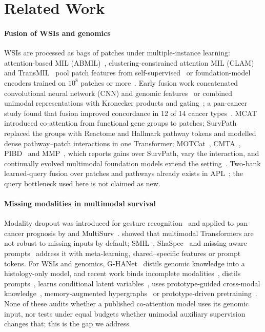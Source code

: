 \documentclass{article}
\begin{document}
\section{Related Work}
\label{sec:related}

\paragraph{Fusion of WSIs and genomics} WSIs are processed as bags of patches under multiple-instance learning: attention-based MIL (ABMIL)~\citep{ilse2018abmil}, clustering-constrained attention MIL (CLAM)~\citep{lu2021clam} and TransMIL~\citep{shao2021transmil} pool patch features from self-supervised~\citep{wang2022ctranspath} or foundation-model encoders trained on $10^8$ patches or more~\citep{chen2024uni,xu2024gigapath,vorontsov2024virchow}. Early fusion work concatenated convolutional neural network (CNN) and genomic features~\citep{mobadersany2018predicting} or combined unimodal representations with Kronecker products and gating~\citep{chen2022pathomic}; a pan-cancer study found that fusion improved concordance in 12 of 14 cancer types~\citep{chen2022pancancer}. MCAT~\citep{chen2021mcat} introduced co-attention from functional gene groups to patches; SurvPath~\citep{jaume2024survpath} replaced the groups with Reactome and Hallmark pathway tokens and modelled dense pathway--patch interactions in one Transformer; MOTCat~\citep{xu2023motcat}, CMTA~\citep{zhou2023cmta}, PIBD~\citep{zhang2024pibd} and MMP~\citep{song2024mmp}, which reports gains over SurvPath, vary the interaction, and continually evolved multimodal foundation models extend the setting~\citep{peng2025continual}. Two-bank learned-query fusion over patches and pathways already exists in APL~\citep{liu2025apl}; the query bottleneck used here is not claimed as new.

\paragraph{Missing modalities in multimodal survival} Modality dropout was introduced for gesture recognition~\citep{neverova2016moddrop} and applied to pan-cancer prognosis by \citet{cheerla2019deep} and MultiSurv~\citep{valesilva2021long}. \citet{ma2022robust} showed that multimodal Transformers are not robust to missing inputs by default; SMIL~\citep{ma2021smil}, ShaSpec~\citep{wang2023shaspec} and missing-aware prompts~\citep{lee2023prompt} address it with meta-learning, shared--specific features or prompt tokens. For WSIs and genomics, G-HANet~\citep{wang2024ghanet} distils genomic knowledge into a histology-only model, and recent work binds incomplete modalities~\citep{qu2024binding}, distils prompts~\citep{xu2025dispro}, learns conditional latent variables~\citep{zhou2025ldcvae}, uses prototype-guided cross-modal knowledge~\citep{liu2025prosurv}, memory-augmented hypergraphs~\citep{qu2025m2surv} or prototype-driven pretraining~\citep{yu2026prime}. None of these audits whether a published co-attention model uses its genomic input, nor tests under equal budgets whether unimodal auxiliary supervision changes that; this is the gap we address.
\end{document}

